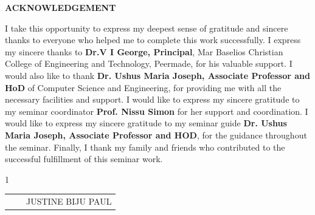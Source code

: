 \begin{center}
    \Large\textbf{ACKNOWLEDGEMENT}
\end{center}

\vspace{1cm}

\fontsize{12pt}{18pt}\selectfont

I take this opportunity to express my deepest sense of gratitude and sincere thanks
to everyone who helped me to complete this work successfully. I express my sincere
thanks to \textbf{Dr.V I George, Principal}, Mar
Baselios Christian College of Engineering and Technology, Peermade, for his valuable support. I would also
like to thank \textbf{Dr. Ushus Maria Joseph, Associate Professor and HoD} of Computer Science
and Engineering, for providing me with all the necessary facilities and
support. I would like to express my sincere gratitude to my seminar coordinator \textbf{Prof. Nissu Simon} for her support and coordination. I would like to express
my sincere gratitude to my seminar guide \textbf{Dr. Ushus Maria Joseph, Associate Professor and HOD}, for the guidance throughout the seminar. Finally, I thank my family and friends who contributed to the successful fulfillment of this seminar work.
\vspace{1cm}

\begin{spacing}{1} 
	
	\begin{table}[h!]
		\centering
		\begin{tabular}{p{5.3cm} p{5.3cm} p{10cm}} 
			\textbf{} &  & {JUSTINE BIJU PAUL} \\
                
			
		\end{tabular}
	\end{table}
\end{spacing}




